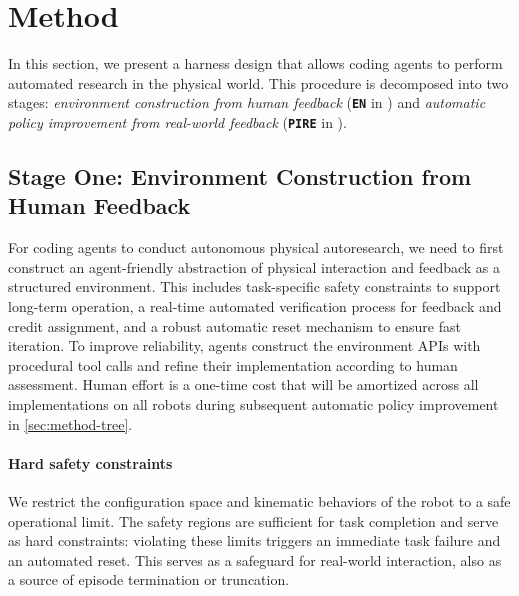 
\section{Method}\label{sec: method}
In this section, we present a harness design that allows coding agents to perform automated research in the physical world. This procedure is decomposed into two stages: \emph{environment construction from human feedback} (\textbf{\texttt{{EN}}} in \method) and \emph{automatic policy improvement from real-world feedback} (\textbf{\texttt{{PIRE}}} in \method). 


\subsection{Stage One: Environment Construction from Human Feedback}\label{sec:method-env}
For coding agents to conduct autonomous physical autoresearch, we need to first construct an agent-friendly abstraction of physical interaction and feedback as a structured environment. This includes task-specific safety constraints to support long-term operation, a real-time automated verification process for feedback and credit assignment, and a robust automatic reset mechanism to ensure fast iteration. To improve reliability, agents construct the environment APIs with procedural tool calls and refine their implementation according to human assessment. Human effort is a one-time cost that will be amortized across all implementations on all robots during subsequent automatic policy improvement in \cref{sec:method-tree}. 

\paragraph{Hard safety constraints} We restrict the configuration space and kinematic behaviors of the robot to a safe operational limit. The safety regions are sufficient for task completion and serve as hard constraints: violating these limits triggers an immediate task failure and an automated reset. This serves as a safeguard for real-world interaction, also as a source of episode termination or truncation.

